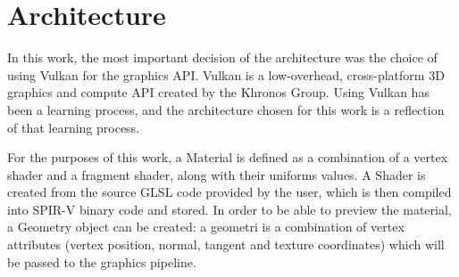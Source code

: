 \section{Architecture}
In this work, the most important decision of the architecture was the choice of using Vulkan for the graphics API. Vulkan is a low-overhead, cross-platform 3D graphics and compute API created by the Khronos Group. Using Vulkan has been a learning process, and the architecture chosen for this work is a reflection of that learning process.

For the purposes of this work, a Material is defined as a combination of a vertex shader and a fragment shader, along with their uniforms values. A Shader is created from the source GLSL code provided by the user, which is then compiled into SPIR-V binary code and stored. In order to be able to preview the material, a Geometry object can be created: a geometri is a combination of vertex attributes (vertex position, normal, tangent and texture coordinates) which will be passed to the graphics pipeline.













